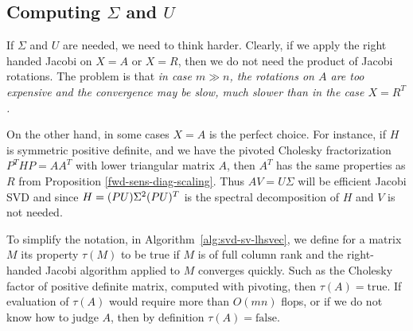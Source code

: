 \documentclass{article}
\begin{document}
\subsection{Computing $\Sigma$ and $U$} 
If $\Sigma$ and $U$ are needed, we need to think harder. Clearly, if we
apply the right handed Jacobi on $X=A$ or $X=R$, then we do not need the
product of Jacobi rotations. The problem is that \emph{in case $m\gg n$,
  the rotations on $A$ are too expensive and the convergence may be slow,
  much slower than in the case $X=R^T$.}

On the other hand, in some cases $X=A$ is the perfect choice. For instance,
if $H$ is symmetric positive definite, and we have the pivoted Cholesky
fractorization $P^THP = AA^T$ with lower triangular matrix $A$, then $A^T$
has the same properties as $R$ from Proposition
\ref{fwd-sens-diag-scaling}. Thus $AV = U\Sigma$ will be efficient Jacobi
SVD and since $H=(PU)\Sigma^2(PU)^{T}$ is the spectral decomposition of $H$
and $V$ is not needed.  

To simplify the notation, in Algorithm~\ref{alg:svd-sv-lhsvec}, we define
for a matrix $M$ its property $\tau(M)$ to be true if $M$ is of full column
rank and the right-handed Jacobi algorithm applied to $M$ converges
quickly. Such as the Cholesky factor of positive definite matrix, computed
with pivoting, then $\tau(A) = \mathrm{true}$. If evaluation of $\tau(A)$
would require more than $O(mn)$ flops, or if we do not know how to judge
$A$, then by definition $\tau(A) = \mathrm{false}$.
\end{document}
